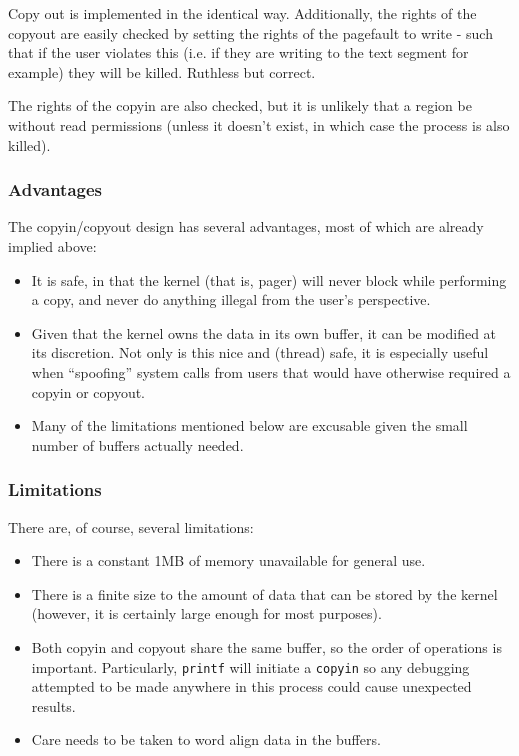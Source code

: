 \documentclass[12pt,english]{article}
\begin{document}
Copy out is implemented in the identical way.  Additionally, the rights of the copyout are easily checked by setting the rights of the pagefault to write - such that if the user violates this (i.e. if they are writing to the text segment for example) they will be killed.  Ruthless but correct.

The rights of the copyin are also checked, but it is unlikely that a region be without read permissions (unless it doesn't exist, in which case the process is also killed).

\subsubsection{Advantages}

The copyin/copyout design has several advantages, most of which are already implied above:
\begin{itemize}
\item It is safe, in that the kernel (that is, pager) will never block while performing a copy, and never do anything illegal from the user's perspective.
\item Given that the kernel owns the data in its own buffer, it can be modified at its discretion.  Not only is this nice and (thread) safe, it is especially useful when ``spoofing'' system calls from users that would have otherwise required a copyin or copyout.
\item Many of the limitations mentioned below are excusable given the small number of buffers actually needed.
\end{itemize}

\subsubsection{Limitations}

There are, of course, several limitations:
\begin{itemize}
\item There is a constant 1MB of memory unavailable for general use.
\item There is a finite size to the amount of data that can be stored by the kernel (however, it is certainly large enough for most purposes).
\item Both copyin and copyout share the same buffer, so the order of operations is important.  Particularly, \texttt{printf} will initiate a \texttt{copyin} so any debugging attempted to be made anywhere in this process could cause unexpected results.
\item Care needs to be taken to word align data in the buffers.
\end{itemize}
\end{document}
